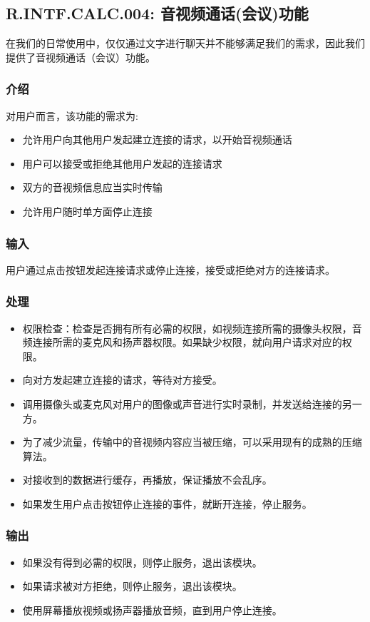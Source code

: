 \subsection{R.INTF.CALC.004: 音视频通话(会议)功能}
在我们的日常使用中，仅仅通过文字进行聊天并不能够满足我们的需求，因此我们提供了音视频通话（会议）功能。
\subsubsection{介绍}
对用户而言，该功能的需求为:
\begin{itemize}
  \item 允许用户向其他用户发起建立连接的请求，以开始音视频通话
  \item 用户可以接受或拒绝其他用户发起的连接请求
  \item 双方的音视频信息应当实时传输
  \item 允许用户随时单方面停止连接
\end{itemize}
\subsubsection{输入}
用户通过点击按钮发起连接请求或停止连接，接受或拒绝对方的连接请求。
\subsubsection{处理}
\begin{itemize}
  \item 权限检查：检查是否拥有所有必需的权限，如视频连接所需的摄像头权限，音频连接所需的麦克风和扬声器权限。如果缺少权限，就向用户请求对应的权限。
  \item 向对方发起建立连接的请求，等待对方接受。
  \item 调用摄像头或麦克风对用户的图像或声音进行实时录制，并发送给连接的另一方。
  \item 为了减少流量，传输中的音视频内容应当被压缩，可以采用现有的成熟的压缩算法。
  \item 对接收到的数据进行缓存，再播放，保证播放不会乱序。
  \item 如果发生用户点击按钮停止连接的事件，就断开连接，停止服务。
\end{itemize}
\subsubsection{输出}
\begin{itemize}
  \item 如果没有得到必需的权限，则停止服务，退出该模块。
  \item 如果请求被对方拒绝，则停止服务，退出该模块。
  \item 使用屏幕播放视频或扬声器播放音频，直到用户停止连接。
\end{itemize}
